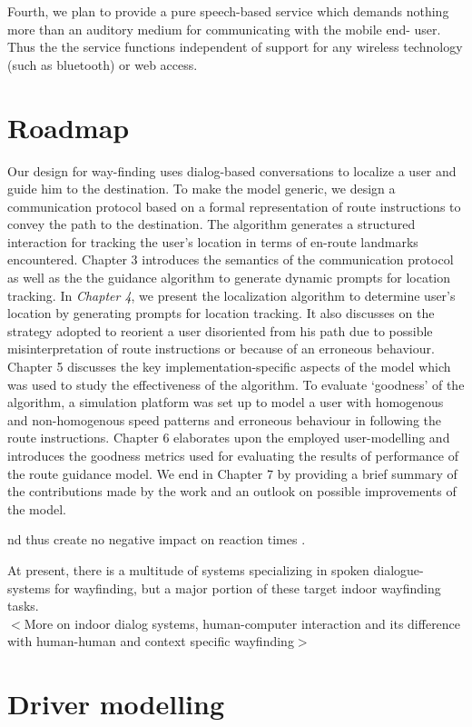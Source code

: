 \documentclass{iitkthesis}
\begin{document}
Fourth, we plan to provide a pure speech-based service which demands 
nothing more than an auditory medium for communicating with the mobile end-
user. Thus the the service functions independent of 
support for any wireless technology (such as bluetooth) or web access.
  \section{Roadmap}
Our design for way-finding uses dialog-based conversations to localize a 
user and guide him to the destination. To make the model generic, we design 
a communication protocol based on a formal representation of route instructions
to convey the path to the destination. The algorithm generates
a structured interaction for tracking the user's 
location in terms of en-route landmarks encountered. Chapter 3 introduces 
the semantics of the communication protocol as well as the the guidance 
algorithm to generate dynamic prompts for location tracking. 
In \textit{Chapter 4}, we present the localization algorithm to determine user's location by generating prompts for location tracking. It also discusses on the strategy adopted to reorient a user disoriented from his path due to possible misinterpretation of route instructions or because of an erroneous behaviour. 
Chapter 5 discusses the key implementation-specific aspects of the 
model which was used to study the effectiveness of the algorithm. To 
evaluate `goodness' of the algorithm, a simulation platform was set up to 
model a user with homogenous and non-homogenous speed patterns and 
erroneous behaviour in following the route instructions. Chapter 6 elaborates 
upon the employed user-modelling and introduces the goodness metrics used for 
evaluating the results of performance of the route guidance model. We end in 
Chapter 7 by providing a brief summary of the contributions made by the work
and an outlook on possible improvements of the model.




nd thus create no negative 
impact on reaction times \cite{srinivasaneffect}. 
 
At present, there is a multitude of systems specializing in spoken 
dialogue-systems for wayfinding, but a major portion of these target indoor 
wayfinding tasks. 
 \\ $<$More on indoor dialog systems, human-computer interaction and its difference with human-human and context specific wayfinding$>$
\fi
 \section{Driver modelling}
\end{document}
